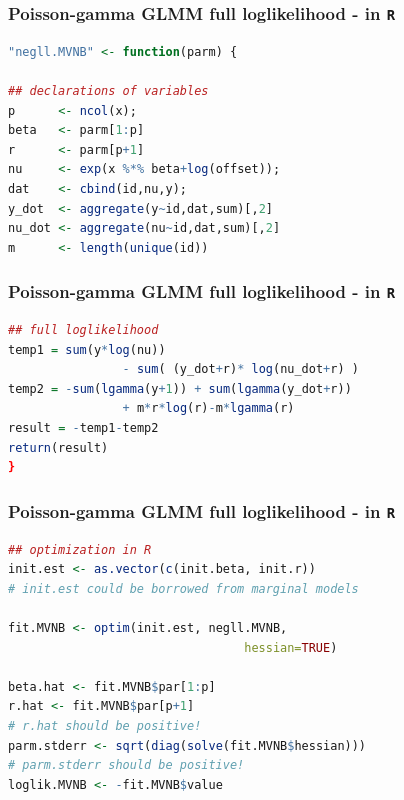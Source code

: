 \documentclass[ignorenonframetext,]{beamer}
\begin{document}
\begin{frame}[fragile]
\frametitle{Poisson-gamma GLMM full loglikelihood - in \texttt{R}}

\begin{lstlisting}[language=R]
"negll.MVNB" <- function(parm) {

## declarations of variables
p      <- ncol(x);
beta   <- parm[1:p]
r      <- parm[p+1]
nu     <- exp(x %*% beta+log(offset));
dat    <- cbind(id,nu,y);
y_dot  <- aggregate(y~id,dat,sum)[,2]
nu_dot <- aggregate(nu~id,dat,sum)[,2]
m      <- length(unique(id))
\end{lstlisting}

\end{frame}

\begin{frame}[fragile]
\frametitle{Poisson-gamma GLMM full loglikelihood - in \texttt{R}}

\begin{lstlisting}[language=R]
## full loglikelihood
temp1 = sum(y*log(nu))
                - sum( (y_dot+r)* log(nu_dot+r) )
temp2 = -sum(lgamma(y+1)) + sum(lgamma(y_dot+r))
                + m*r*log(r)-m*lgamma(r)
result = -temp1-temp2
return(result)
}
\end{lstlisting}

\end{frame}

\begin{frame}[fragile]
\frametitle{Poisson-gamma GLMM full loglikelihood - in \texttt{R}}

\begin{lstlisting}[language=R]
## optimization in R
init.est <- as.vector(c(init.beta, init.r))
# init.est could be borrowed from marginal models

fit.MVNB <- optim(init.est, negll.MVNB,
                                 hessian=TRUE)

beta.hat <- fit.MVNB$par[1:p]
r.hat <- fit.MVNB$par[p+1]
# r.hat should be positive!
parm.stderr <- sqrt(diag(solve(fit.MVNB$hessian)))
# parm.stderr should be positive!
loglik.MVNB <- -fit.MVNB$value
\end{lstlisting}

\end{frame}
\end{document}
